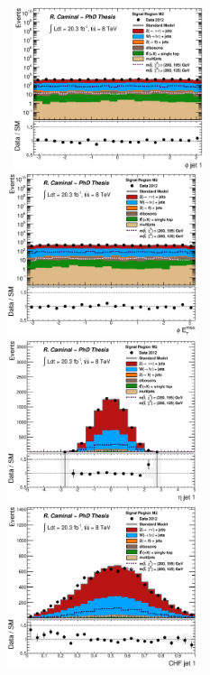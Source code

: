 \begin{figure}[!ht]
  \begin{center}
    \mbox{
      \includegraphics[width=0.495\textwidth]{MonojetAnalysis/Figures/plot_Stop_A3_SR_phi1_fitted.eps}
      \includegraphics[width=0.495\textwidth]{MonojetAnalysis/Figures/plot_Stop_A3_SR_met_phi_fitted.eps}
    }
    \mbox{
      \includegraphics[width=0.495\textwidth]{MonojetAnalysis/Figures/plot_Stop_A3_SR_eta1_fitted.eps}
      \includegraphics[width=0.495\textwidth]{MonojetAnalysis/Figures/plot_Stop_A3_SR_j1_chf_fitted.eps}
}
\end{center}
\end{figure}

